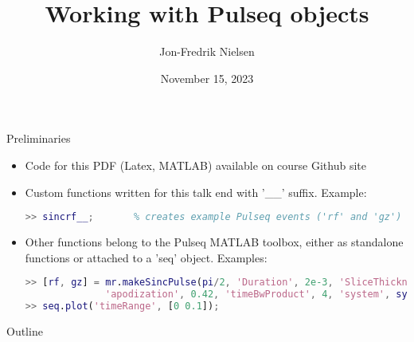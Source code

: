 \documentclass{beamer}
\title{Working with Pulseq objects}
\author{Jon-Fredrik Nielsen}
\date{November 15, 2023}
\begin{document}
\beamertemplatenavigationsymbolsempty

\begin{frame}
    \titlepage 
\end{frame}


\logo{}

\lstset{basicstyle=\tiny}     %


\begin{frame}[fragile]{Preliminaries}    %

\begin{itemize}

\item Code for this PDF (Latex, MATLAB) available on course Github site

\item Custom functions written for this talk end with '\_\_' suffix. Example:
\vspace{-5mm}
\begin{lstlisting}[language=MATLAB,frame=none]
>> sincrf__;       % creates example Pulseq events ('rf' and 'gz')
\end{lstlisting}

\item Other functions belong to the Pulseq MATLAB toolbox, either as standalone functions
or attached to a 'seq' object. Examples:
\vspace{-5mm}
\begin{lstlisting}[language=MATLAB,frame=none]
>> [rf, gz] = mr.makeSincPulse(pi/2, 'Duration', 2e-3, 'SliceThickness', 5e-3, ...
              'apodization', 0.42, 'timeBwProduct', 4, 'system', sys);
>> seq.plot('timeRange', [0 0.1]);
\end{lstlisting}

\end{itemize}

\end{frame}


\begin{frame}{Outline}
    \tableofcontents
\end{frame}



\end{document}
